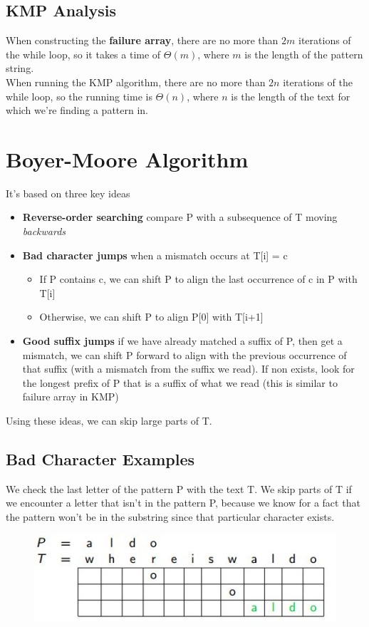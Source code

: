 \documentclass{report}
\begin{document}
\subsection{KMP Analysis}
When constructing the \textbf{failure array}, there are no more than $2m$ iterations of the while loop, so it takes a time of $\Theta(m)$, where $m$ is the length of the pattern string.\\
When running the KMP algorithm, there are no more than $2n$ iterations of the while loop, so the running time is $\Theta(n)$, where $n$ is the length of the text for which we're finding a pattern in.
\section{Boyer-Moore Algorithm}
It's based on three key ideas
\begin{itemize}
\item \textbf{Reverse-order searching} compare P with a subsequence of T moving \textit{backwards}
\item \textbf{Bad character jumps} when a mismatch occurs at T[i] = c
\begin{itemize}
\item If P contains c, we can shift P to align the last occurrence of c in P with T[i]
\item Otherwise, we can shift P to align P[0] with T[i+1]
\end{itemize}
\item \textbf{Good suffix jumps} if we have already matched a suffix of P, then get a mismatch, we can shift P forward to align with the previous occurrence of that suffix (with a mismatch from the suffix we read). If non exists, look for the longest prefix of P that is a suffix of what we read (this is similar to failure array in KMP)
\end{itemize}
Using these ideas, we can skip large parts of T.
\subsection{Bad Character Examples}
We check the last letter of the pattern P with the text T. We skip parts of T if we encounter a letter that isn't in the pattern P, because we know for a fact that the pattern won't be in the substring since that particular character exists.
\begin{figure}[ht]
\begin{center}
\includegraphics[scale=0.8]{bm1.jpg}
\end{center}
\end{figure}
\end{document}
